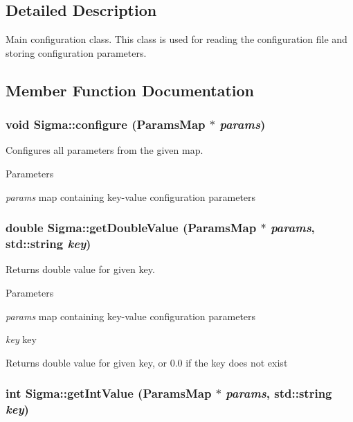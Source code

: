\subsection{Detailed Description}
Main configuration class. This class is used for reading the configuration file and storing configuration parameters. 

\subsection{Member Function Documentation}
\hypertarget{classSigma_ae36d3796eca2942917a455e689b1cf22}{
\subsubsection[{configure}]{\setlength{\rightskip}{0pt plus 5cm}void Sigma::configure ({\bf ParamsMap} $\ast$ {\em params})}}
\label{classSigma_ae36d3796eca2942917a455e689b1cf22}


Configures all parameters from the given map. 
\begin{DoxyParams}{Parameters}
\item[{\em params}]map containing key-\/value configuration parameters \end{DoxyParams}
\hypertarget{classSigma_a4d8f139e0451335bb43af4b451b3e969}{
\subsubsection[{getDoubleValue}]{\setlength{\rightskip}{0pt plus 5cm}double Sigma::getDoubleValue ({\bf ParamsMap} $\ast$ {\em params}, \/  std::string {\em key})}}
\label{classSigma_a4d8f139e0451335bb43af4b451b3e969}


Returns double value for given key. 
\begin{DoxyParams}{Parameters}
\item[{\em params}]map containing key-\/value configuration parameters \item[{\em key}]key \end{DoxyParams}
\begin{DoxyReturn}{Returns}
double value for given key, or 0.0 if the key does not exist 
\end{DoxyReturn}
\hypertarget{classSigma_af1496b16a68d1d49110d70be6309845a}{
\subsubsection[{getIntValue}]{\setlength{\rightskip}{0pt plus 5cm}int Sigma::getIntValue ({\bf ParamsMap} $\ast$ {\em params}, \/  std::string {\em key})}}
\label{classSigma_af1496b16a68d1d49110d70be6309845a}


